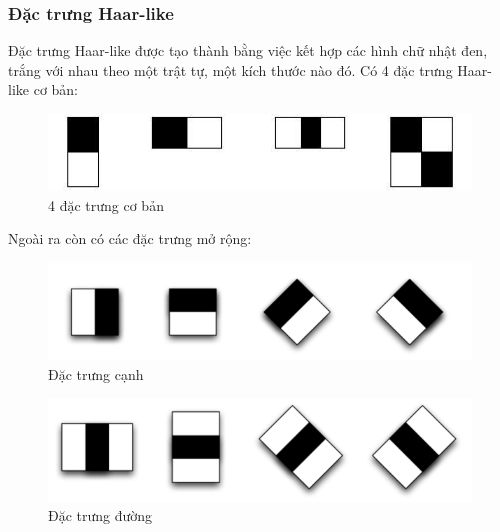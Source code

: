 \documentclass[12pt,a4paper]{article}
\begin{document}
\subsubsection{Đặc trưng Haar-like}
Đặc trưng Haar-like được tạo thành bằng việc kết hợp các hình chữ nhật đen, trắng với nhau theo một trật tự, một kích thước nào đó. Có 4 đặc trưng Haar-like cơ bản:
\begin{center}
    \begin{figure}[htp]
    \begin{center}
    \includegraphics[scale=.7]{Images/Haarlike}
    \end{center}
    \caption{4 đặc trưng cơ bản}
    \end{figure}
\end{center}
Ngoài ra còn có các đặc trưng mở rộng:
\begin{center}
    \begin{figure}[htp]
    \begin{center}
    \includegraphics[scale=.7]{Images/edgefeature}
    \end{center}
    \caption{Đặc trưng cạnh}
    \end{figure}
\end{center}
\begin{center}
    \begin{figure}[htp]
    \begin{center}
    \includegraphics[scale=.7]{Images/linefeature}
    \end{center}
    \caption{Đặc trưng đường}
    \end{figure}
\end{center}
\end{document}
